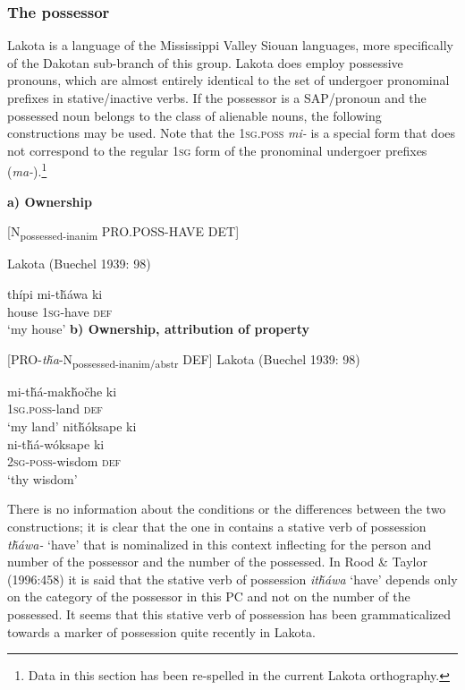 \documentclass[output=paper]{LSP/langsci}
\begin{document}
\subsubsection{The possessor}
Lakota is a language of the Mississippi Valley Siouan languages, more specifically of the Dakotan sub-branch of this group. Lakota does employ possessive pronouns, which are almost entirely identical to the set of undergoer pronominal prefixes in stative/inactive verbs. If the possessor is a SAP/pronoun and the possessed noun belongs to the class of alienable nouns, the following constructions may be used. Note that the \textsc{1sg.poss} \textit{mi-} is a special form that does not correspond to the regular \textsc{1sg} form of the pronominal undergoer prefixes (\textit{ma-}).\footnote{Data in this section has been re-spelled in the current Lakota orthography.}

\vspace{1em}
\textbf{a)	Ownership}

[N\textsubscript{possessed-inanim} PRO.POSS-HAVE DET]
\vspace{1em}

\ea Lakota (Buechel 1939: 98) \label{lakotahouse}

\gll thípi     mi-t\v{h}áwa ki \\
house \textsc{1sg}-have  \textsc{def} \\
\glt `my house'
\z
\vspace{1em}
\textbf{b) Ownership, attribution of property}

[PRO-\textit{t\v{h}a}-N\textsubscript{possessed-inanim/abstr} DEF]
\vspace{1em}
\ea Lakota (Buechel 1939: 98) \label{lakotalandwisdom}

\ea \gll mi-t\v{h}á-mak\v{h}o\v{c}he   ki \\
\textsc{1sg.poss}-land   \textsc{def} \\
\glt `my land'
\ex  
\glll nit\v{h}óksape ki \\
 ni-t\v{h}á-wóksape   ki \\
\textsc{2sg-poss}-wisdom  \textsc{def} \\
\glt `thy wisdom'
\z \z

There is no information about the conditions or the differences between the two constructions; it is clear that the one in  contains a stative verb of possession \textit{t\v{h}áwa-} `have' that is nominalized in this context inflecting for the person and number of the possessor and the number of the possessed. In Rood \& Taylor (1996:458) it is said that the stative verb of possession \textit{it\v{h}áwa} `have' depends only on the category of the possessor in this PC and not on the number of the possessed. It seems that this stative verb of possession has been grammaticalized towards a marker of possession quite recently in Lakota. 
\end{document}
